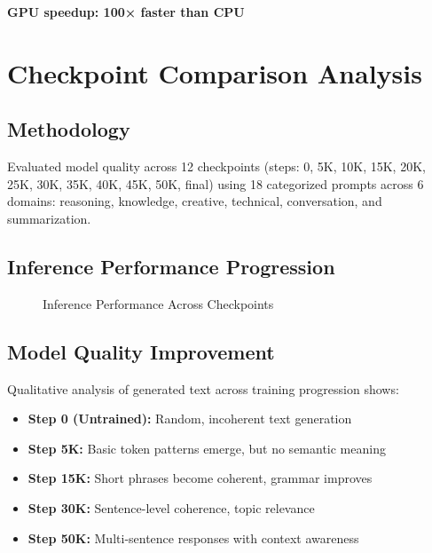 \documentclass[11pt,a4paper]{article}
\begin{document}
\textbf{GPU speedup: 100× faster than CPU}

\section{Checkpoint Comparison Analysis}

\subsection{Methodology}
Evaluated model quality across 12 checkpoints (steps: 0, 5K, 10K, 15K, 20K, 25K, 30K, 35K, 40K, 45K, 50K, final) using 18 categorized prompts across 6 domains: reasoning, knowledge, creative, technical, conversation, and summarization.

\subsection{Inference Performance Progression}

\begin{figure}[H]
\centering
{}
\caption{Inference Performance Across Checkpoints}
\label{fig:inference-speed}
\end{figure}

\subsection{Model Quality Improvement}
Qualitative analysis of generated text across training progression shows:

\begin{itemize}
    \item \textbf{Step 0 (Untrained):} Random, incoherent text generation
    \item \textbf{Step 5K:} Basic token patterns emerge, but no semantic meaning
    \item \textbf{Step 15K:} Short phrases become coherent, grammar improves
    \item \textbf{Step 30K:} Sentence-level coherence, topic relevance
    \item \textbf{Step 50K:} Multi-sentence responses with context awareness
\end{itemize}
\end{document}
